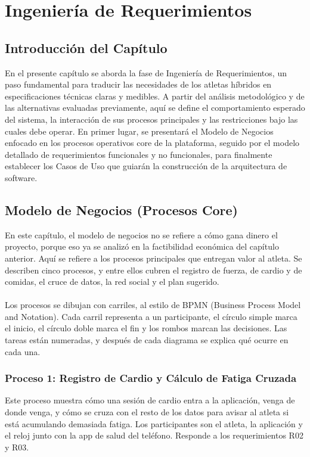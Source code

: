 \section{Ingeniería de Requerimientos}
\subsection{Introducción del Capítulo}
En el presente capítulo se aborda la fase de Ingeniería de Requerimientos, un paso fundamental para traducir las necesidades de los atletas híbridos en especificaciones técnicas claras y medibles. A partir del análisis metodológico y de las alternativas evaluadas previamente, aquí se define el comportamiento esperado del sistema, la interacción de sus procesos principales y las restricciones bajo las cuales debe operar. En primer lugar, se presentará el Modelo de Negocios enfocado en los procesos operativos core de la plataforma, seguido por el modelo detallado de requerimientos funcionales y no funcionales, para finalmente establecer los Casos de Uso que guiarán la construcción de la arquitectura de software.

\subsection{Modelo de Negocios (Procesos Core)}
En este capítulo, el modelo de negocios no se refiere a cómo gana dinero el proyecto, porque eso ya se analizó en la factibilidad económica del capítulo anterior. Aquí se refiere a los procesos principales que entregan valor al atleta. Se describen cinco procesos, y entre ellos cubren el registro de fuerza, de cardio y de comidas, el cruce de datos, la red social y el plan sugerido.
\\\\
Los procesos se dibujan con carriles, al estilo de BPMN (Business Process Model and Notation). Cada carril representa a un participante, el círculo simple marca el inicio, el círculo doble marca el fin y los rombos marcan las decisiones. Las tareas están numeradas, y después de cada diagrama se explica qué ocurre en cada una.
\newpage
\subsubsection{Proceso 1: Registro de Cardio y Cálculo de Fatiga Cruzada}
Este proceso muestra cómo una sesión de cardio entra a la aplicación, venga de donde venga, y cómo se cruza con el resto de los datos para avisar al atleta si está acumulando demasiada fatiga. Los participantes son el atleta, la aplicación y el reloj junto con la app de salud del teléfono. Responde a los requerimientos R02 y R03.

